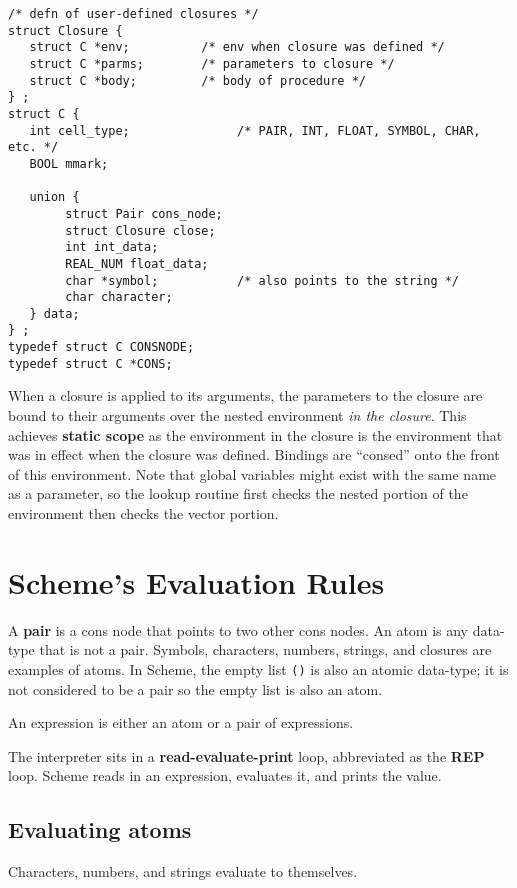 \begin{verbatim}
/* defn of user-defined closures */
struct Closure {
   struct C *env;          /* env when closure was defined */
   struct C *parms;        /* parameters to closure */
   struct C *body;         /* body of procedure */
} ;
struct C {
   int cell_type;               /* PAIR, INT, FLOAT, SYMBOL, CHAR, etc. */
   BOOL mmark;

   union {
        struct Pair cons_node;
        struct Closure close;
        int int_data;
        REAL_NUM float_data;
        char *symbol;           /* also points to the string */
        char character;
   } data;
} ;
typedef struct C CONSNODE;
typedef struct C *CONS;
\end{verbatim}

	When a closure is applied to its arguments, the parameters to the
closure are bound to their arguments over the nested environment {\em in the
closure}.  This achieves {\bf static scope} as the environment in the
closure is the environment that was in effect when the closure was
defined.  Bindings are ``consed'' onto the front of this environment.
Note that global variables might exist with the same name as a parameter,
so the lookup routine first checks the nested portion of the environment
then checks the vector portion.

\section{Scheme's Evaluation Rules}

	A {\bf pair} is a cons node that points to two other cons nodes.
An atom is any data-type that is not a pair.  Symbols, characters,
numbers, strings, and closures are examples of atoms.  In Scheme, the
empty list {\tt ()} is also an atomic data-type; it is not considered to
be a pair so the empty list is also an atom.

	An expression is either an atom or a pair of expressions.

	The interpreter sits in a {\bf read-evaluate-print} loop,
abbreviated as the {\bf REP} loop.  Scheme reads in an expression,
evaluates it, and prints the value.

   \subsection{Evaluating atoms}

	Characters, numbers, and strings evaluate to themselves.


